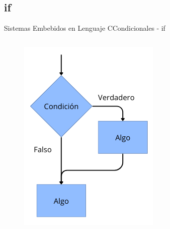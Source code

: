 \documentclass[aspectratio=169, xcolor=dvipsnames]{beamer}
\begin{document}
\subsection{if}
\begin{frame}{Sistemas Embebidos en Lenguaje C}{Condicionales - if}
\begin{columns}
    \begin{column}{0.5\textwidth}
    \begin{figure}
        \centering
        \includegraphics[width=0.6\linewidth]{resources/images/if.png}
    \end{figure}
    \end{column}
    \begin{column}{0.5\textwidth}
    
    \end{column}
\end{columns}
\end{frame}
\end{document}
